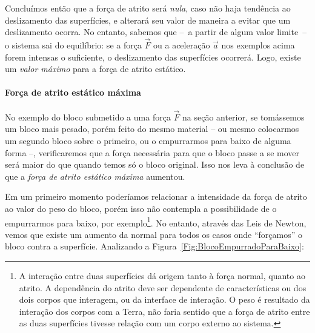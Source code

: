 Concluímos então que a força de atrito será \emph{nula}, caso não haja tendência ao deslizamento das superfícies, e alterará seu valor de maneira a evitar que um deslizamento ocorra. No entanto, sabemos que --~a partir de algum valor limite~-- o sistema sai do equilíbrio: se a força $\vec{F}$ ou a aceleração $\vec{a}$ nos exemplos acima forem intensas o suficiente, o deslizamento das superfícies ocorrerá. Logo, existe um \emph{valor máximo} para a força de atrito estático.

\paragraph{Força de atrito estático máxima} 

No exemplo do bloco submetido a uma força $\vec{F}$ na seção anterior, se tomássemos um bloco mais pesado, porém feito do mesmo material -- ou mesmo colocarmos um segundo bloco sobre o primeiro, ou o empurrarmos para baixo de alguma forma --, verificaremos que a força necessária para que o bloco passe a se mover será maior do que quando temos só o bloco original. Isso nos leva à conclusão de que a \emph{força de atrito estático máxima} aumentou.

Em um primeiro momento poderíamos relacionar a intensidade da força de atrito ao valor do peso do bloco, porém isso não contempla a possibilidade de o empurrarmos para baixo, por exemplo\footnote{A interação entre duas superfícies dá origem tanto à força normal, quanto ao atrito. A dependência do atrito deve ser dependente de características ou dos dois corpos que interagem, ou da interface de interação. O peso é resultado da interação dos corpos com a Terra, não faria sentido que a força de atrito entre as duas superfícies tivesse relação com um corpo externo ao sistema.}. No entanto, através das Leis de Newton, vemos que existe um aumento da normal para todos os casos onde ``forçamos'' o bloco contra a superfície. Analizando a Figura~\ref{Fig:BlocoEmpurradoParaBaixo}:

